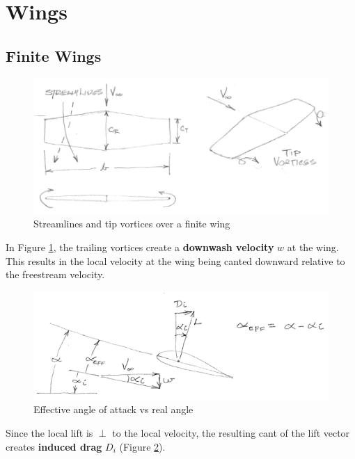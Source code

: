 \documentclass[draft=false, titlepage]{article}
\begin{document}
\clearpage %

\section{Wings}
\subsection{Finite Wings}
\begin{figure}[ht]
    \centering
    \includegraphics[width=0.8\linewidth]{Figures/finiteWingStreamlines.PNG}
    \caption{Streamlines and tip vortices over a finite wing}
    \label{fig:finiteWingStreamlines}
\end{figure}
In Figure \ref{fig:finiteWingStreamlines}, the trailing vortices create a \textbf{downwash velocity} $w$ at the wing. This results in the local velocity at the wing being canted downward relative to the freestream velocity.

\begin{figure}[ht]
    \centering
    \includegraphics[width=0.8\linewidth]{Figures/effectiveAngle.PNG}
    \caption{Effective angle of attack vs real angle}
    \label{fig:effectiveAngle}
\end{figure}
Since the local lift is $\perp$ to the local velocity, the resulting cant of the lift vector creates \textbf{induced drag} $D_i$ (Figure \ref{fig:effectiveAngle}).
\end{document}
